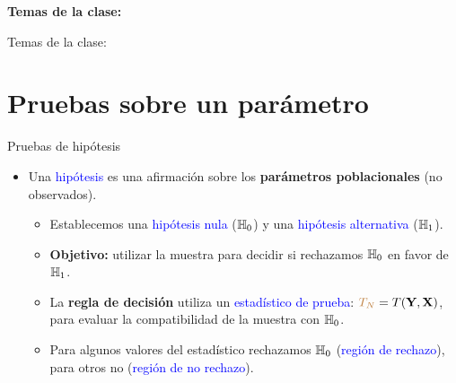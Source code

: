 \documentclass[10pt, xcolor=dvipsnames]{beamer}
\subtitle{Inferencia Estadística}
\begin{document}
	\beamertemplatenavigationsymbolsempty	
\begin{frame}[plain]%
	\titlepage
	\vspace{-0.4cm}
\textbf{Temas de la clase:} \\ \vspace{0.3cm}
	\tableofcontents
\end{frame}

\begin{frame}{Temas de la clase:}
	\tableofcontents
\end{frame}

\section{Pruebas sobre un parámetro}

\begin{frame}{Pruebas de hipótesis}
\begin{itemize}
    \item Una \textcolor{blue}{hipótesis} es una afirmación sobre los \textbf{parámetros poblacionales} (no observados).
    \smallspace
\begin{itemize}
    \item Establecemos una \textcolor{blue}{hipótesis nula} (\(\textcolor{black}{\mathbb{H}_{0}}\)) y una \textcolor{blue}{hipótesis alternativa} (\(\textcolor{black}{\mathbb{H}_{1}}\)). %
    \medskip
    \item \textbf{Objetivo:} utilizar la muestra para decidir si rechazamos \(\textcolor{black}{\mathbb{H}_{0}}\) en favor de \(\textcolor{black}{\mathbb{H}_{1}}\). %
    \medskip
    \item La \textbf{regla de decisión} utiliza un \textcolor{blue}{estadístico de prueba}: \(\textcolor{brown}{T_N} = T(\textbf{Y},\textbf{X})\), para evaluar la compatibilidad de la muestra con \(\textcolor{black}{\mathbb{H}_{0}}\). %
    \medskip
    \item Para algunos valores del estadístico rechazamos $\mathbb{H}_{0}$ (\textcolor{blue}{región de rechazo}), para otros no (\textcolor{blue}{región de no rechazo}).
\end{itemize}
\end{itemize}
\end{frame}
\end{document}
